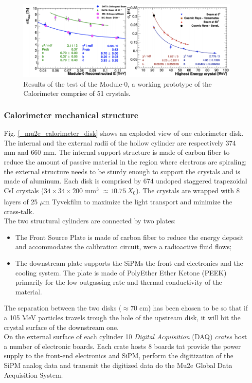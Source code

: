 \documentclass[12pt,a4paper,openright, oneside, titlepage]{book} %
\begin{document}
\begin{figure}[h!]
\centering
\includegraphics[scale=0.5]{calorimeter_test}
\caption[Calorimeter prototype results]{Results of the test of the Module-0, a working prototype of the Calorimeter comprise of 51 crystals. \cite{Donghia:2019} \cite{Calorimeter:2020}}
\label{_calorimeter_test}
\end{figure}


\subsubsection{Calorimeter mechanical structure}
Fig. \ref{_mu2e_calorimeter_disk} shows an exploded view of one calorimeter disk.
The internal and the external radii of the hollow cylinder are respectively 374 mm and 660 mm.
The internal support structure is made of carbon fiber to reduce the amount of passive material in the region 
where electrons are spiraling; 
the external structure needs to be sturdy enough to support the crystals and is made of aluminum. 
Each disk is comprised by 674 undoped staggered trapezoidal CsI crystals ($34\times34\times200$ mm$^3$  $\approx10.75\ X_0$). The crystals are wrapped with 8 layers of 25 $\mu$m Tyvek\textsuperscript \textregistered film to maximize the light transport and minimize the crass-talk. \\
The two structural cylinders are connected by two plates:
\begin{itemize}
\item The Front Source Plate is made of carbon fiber to reduce the energy deposit 
and accommodates the calibration circuit, were a radioactive fluid flows;
\item The downstream plate supports the SiPMs the front-end electronics and the cooling system. 
The plate is made of PolyEther Ether Ketone (PEEK) primarily for the low outgassing rate and thermal conductivity of the material.
\end{itemize} 
The separation between the two disks ($\approx 70$ cm) has been chosen to be so that if a 105 MeV particles travels trough the hole of the upstream disk, it will hit the crystal surface of the downstream one.\\
On the external surface of each cylinder 10 \textit{Digital Acquisition }(DAQ) \textit{crates} 
host a number of electronic boards.
Each crate hosts 8 boards tat provide the power supply to the front-end electronics and SiPM,
perform the digitization of the SiPM analog data and transmit the digitized data do the Mu2e 
Global Data Acquisition System.
\end{document}
